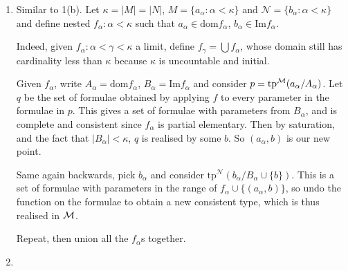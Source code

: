\documentclass[10pt]{article}
\renewcommand{\N}{\mathcal{N}}
\newcommand{\tp}{\textrm{tp}}
\begin{document}
\begin{enumerate}
    \item Similar to 1(b). Let $\kappa = |M| = |N|$, $M = \{a_\alpha : \alpha < \kappa\}$ and $\N = \{b_\alpha : \alpha < \kappa\}$ and define nested $f_\alpha: \alpha < \kappa$ such that $a_\alpha \in \textrm{dom} f_\alpha$, $b_\alpha \in \textrm{Im} f_\alpha$.
    
    Indeed, given $f_\alpha : \alpha < \gamma < \kappa$ a limit, define $f_\gamma = \bigcup f_\alpha$, whose domain still has cardinality less than $\kappa$ because $\kappa$ is uncountable and initial.

    Given $f_\alpha$, write $A_\alpha = \textrm{dom}f_\alpha$, $B_\alpha = \textrm{Im}f_\alpha$ and consider $p = \tp^\M(a_\alpha /A_\alpha)$. Let $q$ be the set of formulae obtained by applying $f$ to every parameter in the formulae in $p$. This gives a set of formulae with parameters from $B_\alpha$, and is complete and consistent since $f_\alpha$ is partial elementary. Then by saturation, and the fact that $|B_\alpha| < \kappa$, $q$ is realised by some $b$. So $(a_\alpha,b)$ is our new point.

    Same again backwards, pick $b_\alpha$ and consider $\tp^\N(b_\alpha/B_\alpha\cup\{b\})$. This is a set of formulae with parameters in the range of $f_\alpha\cup \{(a_\alpha,b)\}$, so undo the function on the formulae to obtain a new consistent type, which is thus realised in $\mathcal{M}$.

    Repeat, then union all the $f_\alpha$s together.

    \item 
\end{enumerate}
\end{document}
